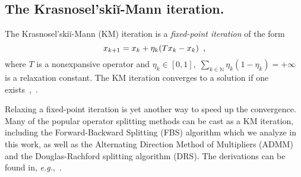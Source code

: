 \documentclass[envcountsect]{svjour3}
\newcommand{\eg}{{\it e.g.}}
\begin{document}



\subsection{The Krasnosel'ski\u{i}-Mann iteration. }\label{ssec::KM} %
The Krasnosel'ski\u{i}-Mann (KM) iteration is a \emph{fixed-point iteration} of the form
\begin{equation}{\label{eq::KMiter}}
 x_{k+1} = x_k + \eta_k (Tx_k-x_k)\enspace,
\end{equation}
where $T$ is a nonexpansive operator and $\eta_k\in[0,1],\;\sum_{k\in\mathbb{N}}\eta_k(1-\eta_k)=+\infty$ is a relaxation constant. The KM iteration converges to a solution if one exists~\cite{Krasnoselskii,Mann},~\cite[Theorem~5.14]{book_comb}.

Relaxing a fixed-point iteration is yet another way to speed up the convergence.
Many of the popular operator splitting methods can be cast as a KM iteration, including the Forward-Backward Splitting (FBS) algorithm which we analyze in this work, as well as the Alternating Direction Method of Multipliers (ADMM) and the Douglas-Rachford splitting algorithm (DRS). The derivations can be found in, \eg,~\cite{liang2014convergence}.
\end{document}
